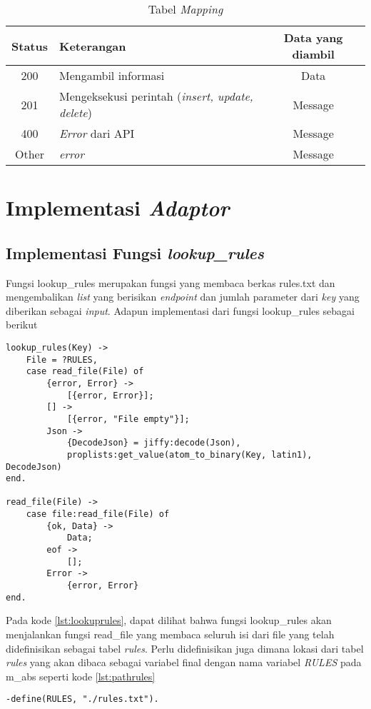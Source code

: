 \begin{table}
	\centering
	\caption{Tabel \textit{Mapping}}
	\label{tab:statuscode}
	\begin{tabular}{| c | l | c |}
		\hline
		Status & Keterangan & Data yang diambil \\ 
		\hline
		200 & Mengambil informasi & Data \\
		201 & Mengeksekusi perintah (\textit{insert, update, delete}) & Message \\
		400 & \textit{Error} dari API & Message \\
		Other & \textit{error} & Message \\
		\hline
	\end{tabular}
\end{table}

\section{Implementasi \textit{Adaptor}}

\subsection{Implementasi Fungsi \textit{lookup\_rules}}

Fungsi lookup\_rules merupakan fungsi yang membaca berkas rules.txt dan mengembalikan \textit{list} yang berisikan \textit{endpoint} dan jumlah parameter dari \textit{key} yang diberikan sebagai \textit{input}. Adapun implementasi dari fungsi lookup\_rules sebagai berikut

\begin{minipage}{\linewidth}
\begin{lstlisting}[caption={Implementasi fungsi lookup\_rules},label={lst:lookuprules}]
lookup_rules(Key) ->
	File = ?RULES,
	case read_file(File) of
		{error, Error} ->
			[{error, Error}];
		[] ->
			[{error, "File empty"}];
		Json ->
			{DecodeJson} = jiffy:decode(Json),
			proplists:get_value(atom_to_binary(Key, latin1), DecodeJson)
end.

read_file(File) ->
	case file:read_file(File) of
		{ok, Data} ->
			Data;
		eof ->
			[];
		Error ->
			{error, Error}
end.
\end{lstlisting}
\end{minipage}

Pada kode \ref{lst:lookuprules}, dapat dilihat bahwa fungsi lookup\_rules akan menjalankan fungsi read\_file yang membaca seluruh isi dari file yang telah didefinisikan sebagai tabel \textit{rules}. Perlu didefinisikan juga dimana lokasi dari tabel \textit{rules} yang akan dibaca sebagai variabel final dengan nama variabel \textit{RULES} pada m\_abs seperti kode \ref{lst:pathrules}
\begin{minipage}{\linewidth}
\begin{lstlisting}[caption={lokasi dari \textit{file} rules.txt},label={lst:pathrules}]
-define(RULES, "./rules.txt").
\end{lstlisting}
\end{minipage}

